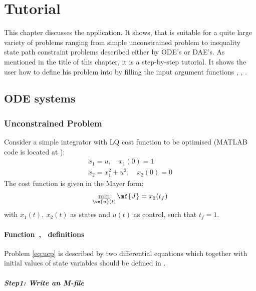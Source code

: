 \chapter{Tutorial}
\label{cha:tutorial}

This chapter discusses the  application. It shows, that
 is suitable for a quite large variety of problems
ranging from simple unconstrained problem to inequality state path
constraint problems described either by ODE's or DAE's. As mentioned in
the title of this chapter, it is a step-by-step tutorial. It shows
the user how to define his problem into  by filling the
input argument functions , , . 

\section{ODE systems}
\label{sec:odes}

\subsection{Unconstrained Problem}
\label{sec:unconprob}

Consider a simple integrator with LQ cost function to be
optimised \citep{luu91,raj01} (MATLAB code is located
at ): 
\begin{gather}
\dot{x}_1 = u, \quad x_{1}(0) = 1\\
\dot{x}_2 = x^{2}_{1} + u^{2}, \quad x_{2}(0) = 0
\end{gather}
The cost function is given in the Mayer form:
\begin{equation}
\min_{\ve{u}(t)} \mf{J} = x_{2}(t_{f}) \label{eq:ucp} 
\end{equation} with $x_{1}(t),~x_{2}(t)$ as states and $u(t)$ as
control, such that $t_{f} = 1$.

\subsubsection{Function~,~  definitions}
\label{sec:unconprob-fundef}

Problem \eqref{eq:ucp} is described by two differential equations
which together with initial values of state variables should be
defined in .

\paragraph{Step1: Write an M-file~}

